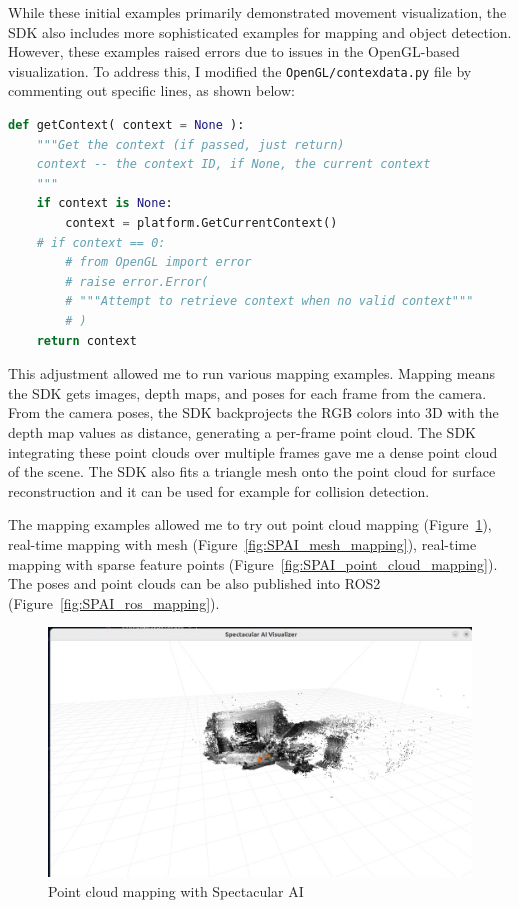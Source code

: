 While these initial examples primarily demonstrated movement visualization, the SDK also includes more sophisticated examples for mapping and object detection. However, these examples raised errors due to issues in the OpenGL-based visualization. To address this, I modified the \verb|OpenGL/contexdata.py| file by commenting out specific lines, as shown below:

\begin{lstlisting}[language=python,frame=single,float=!ht]
def getContext( context = None ):
    """Get the context (if passed, just return)
    context -- the context ID, if None, the current context
    """
    if context is None:
        context = platform.GetCurrentContext()
    # if context == 0:
        # from OpenGL import error
        # raise error.Error(
        # """Attempt to retrieve context when no valid context"""
        # )
    return context
\end{lstlisting}
\FloatBarrier

This adjustment allowed me to run various mapping examples. Mapping means the SDK gets images, depth maps, and poses for each frame from the camera. From the camera poses, the SDK backprojects the RGB colors into 3D with the depth map values as distance, generating a per-frame point cloud. The SDK integrating these point clouds over multiple frames gave me a dense point cloud of the scene. The SDK also fits a triangle mesh onto the point cloud for surface reconstruction and it can be used for example for collision detection.

The mapping examples allowed me to try out point cloud mapping (Figure~\ref{fig:SPAI_mapping}), real-time mapping with mesh (Figure~\ref{fig:SPAI_mesh_mapping}), real-time mapping with sparse feature points (Figure~\ref{fig:SPAI_point_cloud_mapping}). The poses and point clouds can be also published into ROS2 (Figure~\ref{fig:SPAI_ros_mapping}).

\begin{figure}[htbp]
	\centering
	\includegraphics[width=150mm, keepaspectratio]{figures_jpg/spectacular_ai_mapping_visu.jpg}
	\caption{Point cloud mapping with Spectacular AI}
	\label{fig:SPAI_mapping}
\end{figure}

